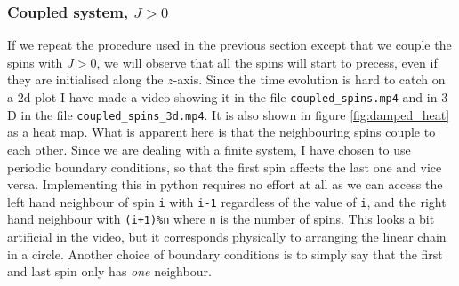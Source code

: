 \subsubsection{Coupled system, $J > 0$}

If we repeat the procedure used in the previous section except that we couple the spins with $J > 0$, we will observe that all the spins will start to precess, even if they are initialised along the $z$-axis. Since the time evolution is hard to catch on a $2\mathrm{d}$ plot I have made a video showing it in the file \lstinline|coupled_spins.mp4| and in $3$D in the file \lstinline|coupled_spins_3d.mp4|. It is also shown in figure \ref{fig:damped_heat} as a heat map. What is apparent here is that the neighbouring spins couple to each other. Since we are dealing with a finite system, I have chosen to use periodic boundary conditions, so that the first spin affects the last one and vice versa. Implementing this in python requires no effort at all as we can access the left hand neighbour of spin \texttt{i} with \texttt{i-1} regardless of the value of \texttt{i}, and the right hand neighbour with \texttt{(i+1)\%n} where \texttt{n} is the number of spins. This looks a bit artificial in the video, but it corresponds physically to arranging the linear chain in a circle. Another choice of boundary conditions is to simply say that the first and last spin only has \textit{one} neighbour. 


